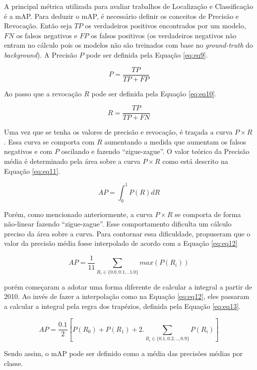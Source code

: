 A principal métrica utilizada para avaliar trabalhos de Localização e Classificação é a \ac{mAP}. Para deduzir o \ac{mAP}, é necessário definir os conceitos de Precisão e Revocação. Então seja $TP$ os verdadeiros positivos encontrados por um modelo, $FN$ os falsos negativos e $FP$ os falsos positivos (os verdadeiros negativos não entram no cálculo pois os modelos não são treinados com base no \textit{ground-truth} do \textit{background}). A Precisão $P$ pode ser definida pela Equação \ref{eq:eq9}.

\begin{equation}
	\label{eq:eq9}
	P = \dfrac{TP}{TP+FP}
\end{equation}

\noindent
Ao passo que a revocação $R$ pode ser definida pela Equação \ref{eq:eq10}.

\begin{equation}
	\label{eq:eq10}
	R = \dfrac{TP}{TP+FN}
\end{equation}

Uma vez que se tenha os valores de precisão e revocação, é traçada a curva $P \times R$. Essa curva se comporta com $R$ aumentando a medida que aumentam os falsos negativos e com $P$ oscilando e fazendo ``zigue-zague''. O valor teórico da Precisão média é determinado pela área sobre a curva $P \times R$ como está descrito na Equação \ref{eq:eq11}.

\begin{equation}
	\label{eq:eq11}
	AP = \int_{0}^{1}P(R)dR
\end{equation}

Porém, como mencionado anteriormente, a curva $P \times R$ se comporta de forma não-linear fazendo ``zigue-zague''. Esse comportamento dificulta um cálculo preciso da área sobre a curva. Para contornar essa dificuldade,  propuseram que o valor da precisão média fosse interpolado de acordo com a Equação \ref{eq:eq12}

\begin{equation}
	\label{eq:eq12}
	AP = \dfrac{1}{11} \sum_{R_i \in \{0.0, 0.1, .. 1.0\}} max(P(R_i))
\end{equation}

 porém começaram a adotar uma forma diferente de calcular a integral a partir de 2010. Ao invés de fazer a interpolação como na Equação \ref{eq:eq12}, eles passaram a calcular a integral pela regra dos trapézios, definida pela Equação \ref{eq:eq13}.

\begin{equation}
	\label{eq:eq13}
	AP = \dfrac{0.1}{2}[P(R_0) + P(R_1) + 2.\sum_{R_i \in \{0.1, 0.2, .., 0.9\}}P(R_i)]
\end{equation}

Sendo assim, o \ac{mAP} pode ser definido como a média das precisões médias por classe.